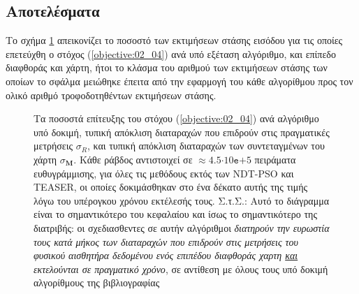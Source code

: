\subsection{Αποτελέσματα}
\label{subsection:02_04_05:02}

Το σχήμα \ref{fig:02_04_05:01} απεικονίζει το ποσοστό των εκτιμήσεων στάσης
εισόδου για τις οποίες επετεύχθη ο στόχος (\ref{objective:02_04}) ανά υπό
εξέταση αλγόριθμο, και επίπεδο διαφθοράς και χάρτη, ήτοι το κλάσμα του αριθμού
των εκτιμήσεων στάσης των οποίων το σφάλμα μειώθηκε έπειτα από την εφαρμογή του
κάθε αλγορίθμου προς τον ολικό αριθμό τροφοδοτηθέντων εκτιμήσεων στάσης.

\begin{figure}[!h]\vspace{1.5cm}\hspace{0.6cm}%
  
  \vspace{0.75cm}
  \caption{\small Τα ποσοστά επίτευξης του στόχου (\ref{objective:02_04}) ανά
           αλγόριθμο υπό δοκιμή, τυπική απόκλιση διαταραχών που επιδρούν στις
           πραγματικές μετρήσεις $\sigma_R$, και τυπική απόκλιση διαταραχών των
           συντεταγμένων του χάρτη $\sigma_{\bm{M}}$. Κάθε ράβδος αντιστοιχεί
           σε $\approx 4.5$$\cdot$$10\texttt{e}$$+$$5$ πειράματα ευθυγράμμισης,
           για όλες τις μεθόδους εκτός των NDT-PSO και TEASER, οι οποίες
           δοκιμάσθηκαν στο ένα δέκατο αυτής της τιμής λόγω του υπέρογκου
           χρόνου εκτέλεσής τους.  Σ.τ.Σ.: Αυτό το διάγραμμα είναι το
           σημαντικότερο του κεφαλαίου και ίσως το σημαντικότερο της διατριβής:
           οι σχεδιασθεντες σε αυτήν αλγόριθμοι \textit{διατηρούν την ευρωστία
           τους κατά μήκος των διαταραχών που επιδρούν στις μετρήσεις του
           φυσικού αισθητήρα δεδομένου ενός επιπέδου διαφθοράς χαρτη
           \underline{και} εκτελούνται σε πραγματικό χρόνο}, σε αντίθεση με
           όλους τους υπό δοκιμή αλγορίθμους της βιβλιογραφίας}
  \label{fig:02_04_05:01}
\end{figure}

\begin{figure}[!h]\vspace{3cm}%
  
  \vspace{1cm}
  \caption{}
  \label{}
\end{figure}

